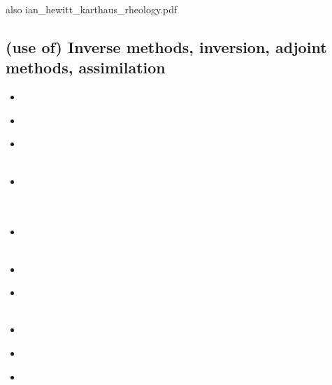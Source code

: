 also ian\_hewitt\_karthaus\_rheology.pdf

\subsection{(use of) Inverse methods, inversion, adjoint methods, assimilation}


\begin{scriptsize}
\begin{itemize}
\item[\nineteenninetysix] 
\textcite{fomi96}  \\ 
\item[\nineteenninetyeight] 
\textcite{cava98}  \\
\item[\nineteenninetynine] 
\textcite{samb99}   \\
\textcite{samb99b} \\
\item[\twothousandone] 
\textcite{bomo01} \\ 
\textcite{kapo01} \\ 
\textcite{kasc01} \\
\item[\twothousandtwo] 
\textcite{shri02} \\
\textcite{burb02} \\
\item[\twothousandfour] 
\textcite{mifo04} \\
\item[\twothousandsix] 
\textcite{sifg06} \\
\textcite{iskt06} \\
\item[\twothousandseven] 
\textcite{isks07} \\
\item[\twothousandnine] 
\textcite{sifg09} \\
\item[\twothousandtwelve] 

\end{itemize}
\end{scriptsize}
